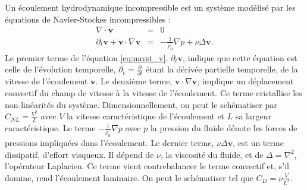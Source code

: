 Un écoulement hydrodynamique incompressible est un système modélisé par les équations de Navier-Stockes incompressibles : 
\begin{eqnarray}
     \label{eq:navst_r} \nabla \cdot \boldsymbol{v} & =& 0 \\
  \label{eq:navst_v}  \partial_t \boldsymbol{v} + \boldsymbol{v} \cdot \nabla \boldsymbol{v} &=& - \frac{1}{\rho_0} \nabla p + \nu \Delta \boldsymbol{v}.
\end{eqnarray}
Le premier terme de l'équation \eqref{eq:navst_v}, $\partial_t \boldsymbol{v}$, indique que cette équation est celle de l'évolution temporelle, $\partial_t = \frac{\partial}{\partial t}$ étant la dérivée partielle temporelle, de la vitesse de l'écoulement $\boldsymbol{v}$. 
Le deuxième terme, $\boldsymbol{v} \cdot \nabla \boldsymbol{v}$, implique un déplacement convectif du champ de vitesse à la vitesse de l'écoulement. Ce terme cristallise les non-linéarités du système. Dimensionnellement, on peut le schématiser par $C_{NL} = \frac{V^2}{L}$ avec $V$ la vitesse caractéristique de l'écoulement et $L$ sa largeur caractéristique. 
Le terme $- \frac{1}{\rho_0} \nabla p $ avec $p$ la pression du fluide dénote les forces de pressions impliquées dans l'écoulement. 
Le dernier terme, $\nu \Delta \boldsymbol{v}$, est un terme dissipatif, d'effort visqueux. Il dépend de $\nu$, la viscosité du fluide, et de $\Delta = \nabla^2$, l'opérateur Laplacien. Ce terme vient contrebalancer le terme convectif et, s'il domine, rend l'écoulement laminaire. On peut le schématiser tel que $C_{D} = \nu \frac{V}{L^2}$. 


